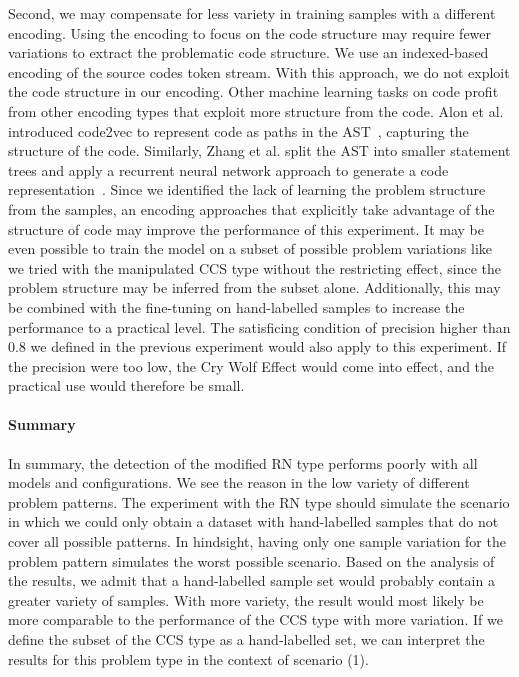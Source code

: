 Second, we may compensate for less variety in training samples with a different encoding. Using the encoding to focus on the code structure may require fewer variations to extract the problematic code structure. We use an indexed-based encoding of the source codes token stream. With this approach, we do not exploit the code structure in our encoding. Other machine learning tasks on code profit from other encoding types that exploit more structure from the code. Alon et al. introduced code2vec to represent code as paths in the AST~\cite{alon_code2vec_2018}, capturing the structure of the code. Similarly, Zhang et al. split the AST into smaller statement trees and apply a recurrent neural network approach to generate a code representation~\cite{zhang_novel_2019}.
Since we identified the lack of learning the problem structure from the samples, an encoding approaches that explicitly take advantage of the structure of code may improve the performance of this experiment. It may be even possible to train the model on a subset of possible problem variations like we tried with the manipulated CCS type without the restricting effect, since the problem structure may be inferred from the subset alone.
Additionally, this may be combined with the fine-tuning on hand-labelled samples to increase the performance to a practical level. The satisficing condition of precision higher than 0.8 we defined in the previous experiment would also apply to this experiment. 
If the precision were too low, the Cry Wolf Effect would come into effect, and the practical use would therefore be small.

\paragraph{Summary}
In summary, the detection of the modified RN type performs poorly with all models and configurations. We see the reason in the low variety of different problem patterns. The experiment with the RN type should simulate the scenario in which we could only obtain a dataset with hand-labelled samples that do not cover all possible patterns. In hindsight, having only one sample variation for the problem pattern simulates the worst possible scenario. Based on the analysis of the results, we admit that a hand-labelled sample set would probably contain a greater variety of samples. With more variety, the result would most likely be more comparable to the performance of the CCS type with more variation. If we define the subset of the CCS type as a hand-labelled set, we can interpret the results for this problem type in the context of scenario (1). 

